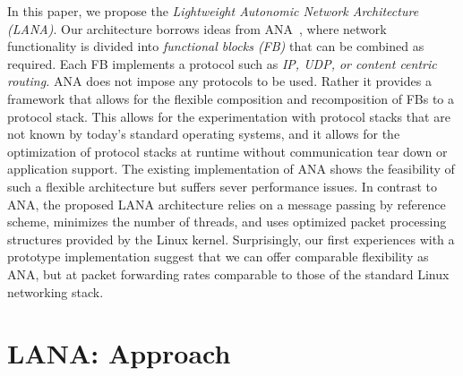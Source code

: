 \documentclass{sig-alternate}
\newcommand{\wolfgang}[1]{\textcolor{blue}{\emph{WM: #1}}}
\begin{document}
In this paper, we propose the \textit{Lightweight Autonomic Network
Architecture (LANA)}. Our architecture borrows ideas from
ANA~\cite{ANAJournal}, where network functionality is divided into
\textit{functional blocks (FB)} that can be combined as required. Each FB
implements a protocol such as \textit{IP, UDP, or content centric
routing.} ANA does not impose any protocols to be used. Rather it provides a framework that allows for the flexible
composition and recomposition of FBs to a protocol stack. This allows for the
experimentation with protocol stacks that are not known by today's standard
operating systems, and it allows for the optimization of protocol stacks at
runtime without communication tear down or application support.  The existing
implementation of ANA shows the feasibility of such a flexible architecture but
suffers sever performance issues. 
In contrast to ANA, the proposed LANA architecture relies on a message passing by reference scheme, minimizes the number of threads, and uses optimized packet processing structures provided by the Linux kernel.
Surprisingly, our first experiences with a
prototype implementation suggest that we can offer comparable %
flexibility as ANA, but at packet forwarding rates comparable to those of the
standard Linux networking stack. 

\section{LANA: Approach}


\end{document}
